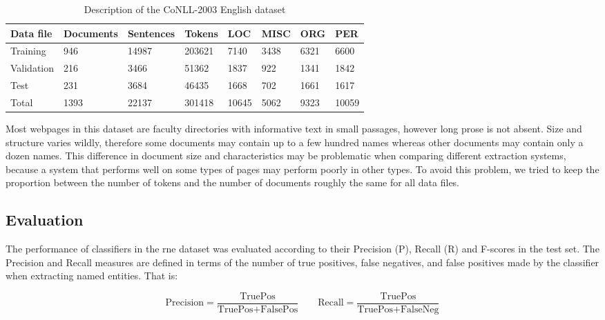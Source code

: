 \documentclass{nle}
\begin{document}
\begin{table}[h]
  \small
  \begin{center}
    \begin{tabular}{ llllllll }
      \toprule
      Data file & Documents & Sentences & Tokens & LOC & MISC & ORG & PER \\
      \midrule
      Training    & 946  & 14987 & 203621 & 7140 & 3438 & 6321 & 6600 \\  
      Validation  & 216  & 3466  & 51362 & 1837 & 922 & 1341 & 1842  \\
      Test        & 231  & 3684  & 46435 & 1668 & 702 & 1661 & 1617  \\
      \midrule
      Total       & 1393 & 22137 & 301418 & 10645 & 5062 & 9323 & 10059 \\
      \bottomrule
    \end{tabular}
  \end{center}
  \caption{Description of the {CoNLL-2003} English dataset}
  \label{tab:conll}
\end{table}


Most webpages in this dataset are faculty directories with informative
text in small passages, however long prose is not absent. 
Size and structure varies wildly, therefore some documents 
may contain up to a few hundred names whereas other documents may contain 
only a dozen names. This difference in document size and characteristics 
may be problematic when comparing different extraction systems, because a system 
that performs well on some types of pages may perform poorly in other types.
To avoid this problem, we tried to keep the proportion between the number of tokens
and the number of documents roughly the same for all data files.

\subsection{Evaluation}
\label{sec:evaluation}

The performance of classifiers in the \gls{rne} dataset was evaluated according to their Precision (P), Recall (R) and F-scores
in the test set. The Precision and Recall 
measures are defined in terms of the number of true positives, false negatives, and false 
positives made by the classifier when extracting named entities. That is:

\begin{equation*}
\text{Precision} = \frac{\text{TruePos}}{\text{TruePos} + \text{FalsePos}}      
\qquad
\text{Recall} = \frac{\text{TruePos}}{\text{TruePos} + \text{FalseNeg}}
\end{equation*}
\end{document}

